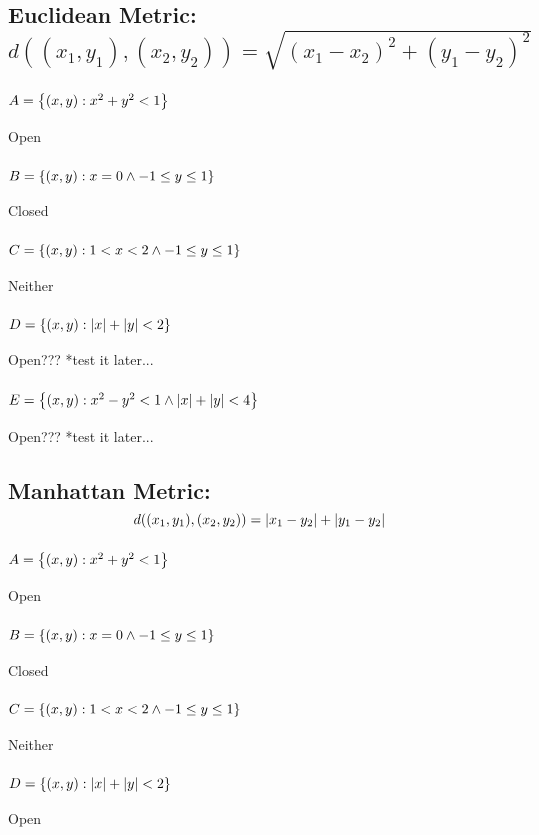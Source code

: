 \documentclass[]{article}
\begin{document}
\subsection{Euclidean Metric: 
$d((x_1,y_1),(x_2,y_2)) = \sqrt{(x_1-x_2)^2 + (y_1-y_2)^2}$%
}
\subsubsection{$A = \qty{(x,y) : x^2 + y^2 < 1}$}
Open
\subsubsection{$B = \qty{(x,y) : x = 0 \land -1 \leq y \leq 1}$}
Closed
\subsubsection{$C = \qty{(x,y) : 1 < x < 2 \land -1 \leq y \leq 1}$}
Neither
\subsubsection{$D = \qty{(x,y) : \abs{x} + \abs{y} < 2}$}
Open??? *test it later...
\subsubsection{$E = \qty{(x,y) : x^2 - y^2 < 1 \land \abs{x} + \abs{y} < 4}$}
Open??? *test it later...

\subsection{Manhattan Metric: 
$$d((x_1,y_1),(x_2,y_2)) = \abs{x_1-y_2} + \abs{y_1-y_2}$$%
}
\subsubsection{$A = \qty{(x,y) : x^2 + y^2 < 1}$}
Open
\subsubsection{$B = \qty{(x,y) : x = 0 \land -1 \leq y \leq 1}$}
Closed
\subsubsection{$C = \qty{(x,y) : 1 < x < 2 \land -1 \leq y \leq 1}$}
Neither
\subsubsection{$D = \qty{(x,y) : \abs{x} + \abs{y} < 2}$}
Open
\end{document}
